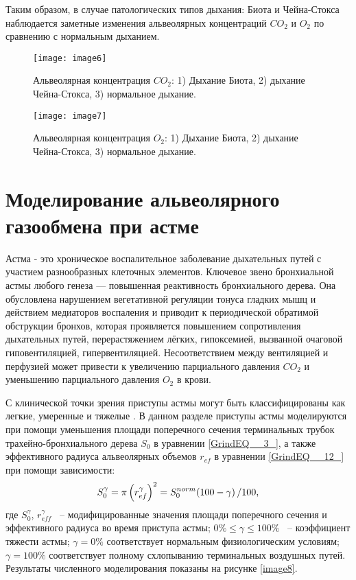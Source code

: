 Таким образом, в случае патологических типов дыхания: Биота и Чейна-Стокса наблюдается заметные изменения альвеолярных концентраций $CO_{2} $ и $O_{2} $ по сравнению с нормальным дыханием.

\begin{figure}[!ht]
	\centering
	\texttt{[image: image6]}
	\caption{Альвеолярная концентрация $CO_{2} $: 1) Дыхание Биота, 2) дыхание Чейна-Стокса, 3) нормальное дыхание.} 
	\label{image6}
\end{figure}

\begin{figure}[!ht]
	\centering
	\texttt{[image: image7]}
	\caption{Альвеолярная концентрация $O_{2} $: 1) Дыхание Биота, 2) дыхание Чейна-Стокса, 3) нормальное дыхание.} 
	\label{image7}
\end{figure}

\section{Моделирование альвеолярного газообмена при астме}
Астма - это хроническое воспалительное заболевание дыхательных путей с участием разнообразных клеточных элементов. Ключевое звено бронхиальной астмы любого генеза — повышенная реактивность бронхиального дерева. Она обусловлена нарушением вегетативной регуляции тонуса гладких мышц и действием медиаторов воспаления и приводит к периодической обратимой обструкции бронхов, которая проявляется повышением сопротивления дыхательных путей, перерастяжением лёгких, гипоксемией, вызванной очаговой гиповентиляцией, гипервентиляцией. Несоответствием между вентиляцией и перфузией может привести к увеличению парциального давления $CO_{2} $ и уменьшению парциального давления $O_{2} $ в крови. 

С клинической точки зрения приступы астмы могут быть классифицированы как легкие, умеренные и тяжелые \cite{Colice2004}. В данном разделе приступы астмы моделируются при помощи уменьшения площади поперечного сечения терминальных трубок трахейно-бронхиального дерева $S_{0} $ в уравнении \eqref{GrindEQ__3_}, а также эффективного радиуса альвеолярных объемов $r_{ef} $ в уравнении \eqref{GrindEQ__12_} при помощи зависимости:
\begin{equation} \label{GrindEQ__43_} 
S_{0}^{\gamma } =\pi \left(r_{ef}^{\gamma } \right)^{2} =S_{0}^{norm} {\left(100-\gamma \right)\mathord{\left/ {\vphantom {\left(100-\gamma \right) 100}} \right. \kern-\nulldelimiterspace} 100} ,  
\end{equation} 
где $S_{0}^{\gamma } $, $r_{eff}^{\gamma } $ ~-- модифицированные значения площади поперечного сечения и эффективного радиуса во время приступа астмы; $0\% \le \gamma \le 100\% $ ~-- коэффициент тяжести астмы; $\gamma =0\% $ соответствует нормальным физиологическим условиям; $\gamma =100\% $ соответствует полному схлопыванию терминальных воздушных путей. Результаты численного моделирования показаны на рисунке \ref{image8}.

